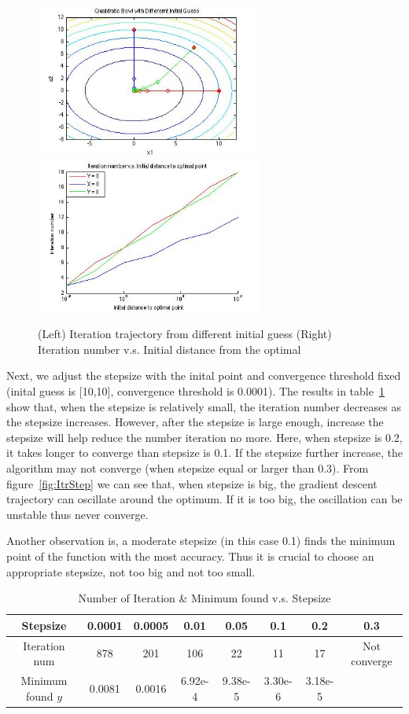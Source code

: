 \begin{figure}[h]
 \centering
\includegraphics[height=2in]{figures/p1_QualdraticBowlWDifferenrtInitial} 
\includegraphics[height=2in]{figures/p1_QualdraticItrInit} 
    \caption{(Left) Iteration trajectory from different initial guess (Right) Iteration number v.s. Initial distance from the optimal}
    \label{fig:Itr}
\end{figure}

Next, we adjust the stepsize with the inital point and convergence threshold fixed (inital guess is [10,10], convergence threshold is 0.0001). The results in table~\ref{tab:ItrStep} show that, when the stepsize is relatively small, the iteration number decreases as the stepsize increases. However, after the stepsize is large enough, increase the stepsize will help reduce the number iteration no more. Here, when stepsize is 0.2, it takes longer to converge than stepsize is 0.1. If the stepsize further increase, the algorithm may not converge (when stepsize equal or larger than 0.3). From figure~\ref{fig:ItrStep} we can see that, when stepsize is big, the gradient descent trajectory can oscillate around the optimum. If it is too big, the oscillation can be unstable thus never converge.

Another observation is, a moderate stepsize (in this case 0.1) finds the minimum point of the function with the most accuracy. Thus it is crucial to choose an appropriate stepsize, not too big and not too small.

\begin{table}[h]
\centering
\caption{Number of Iteration \& Minimum found v.s. Stepsize} \label{tab:ItrStep} 
\begin{tabular}{ | c | c | c | c | c | c | c | c |  }
\hline 
Stepsize & 0.0001 & 0.0005 & 0.01 & 0.05 & 0.1 & 0.2 & 0.3 \\
\hline 
Iteration num & 878 & 201 & 106 & 22 & 11 & 17 & Not converge \\
\hline
Minimum found $y$ & 0.0081 & 0.0016 & 6.92e-4&9.38e-5 & 3.30e-6 & 3.18e-5\\
\hline
\end{tabular}
\end{table}

